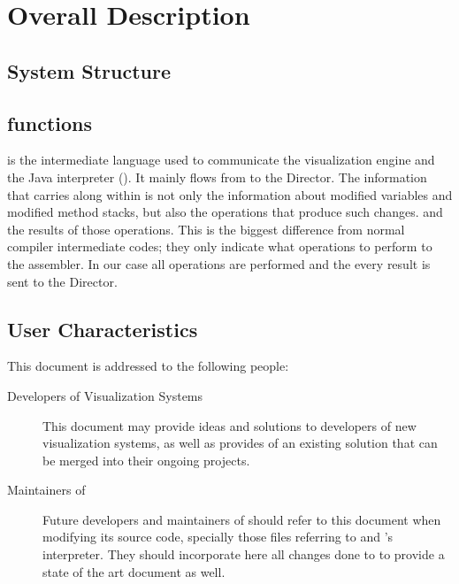 \chapter{Overall Description}
\label{ch:overall}

\section{\jel{} System Structure}
\label{sec:structure}

\section{\mcode{} functions}
\label{sec:functions}
\mcode{} is the intermediate language used to communicate the visualization engine and the Java interpreter (\djava{}). It mainly flows from \djava{}to the Director.  The information that carries along within is not only the information about modified variables and modified method stacks, but also the operations that produce such changes. and the results of those operations. This is the biggest difference from normal compiler intermediate codes; they only indicate what operations to perform to the assembler. In our case all operations are performed and the every result is sent to the Director.

\section{User Characteristics}
\label{sec:users}
This document is addressed to the following people:
\begin{description}
\item[Developers of Visualization Systems] This document may provide ideas and solutions to developers of new visualization systems, as well as provides of an existing solution that can be merged into their ongoing projects.
\item[Maintainers of \jel{}] Future developers and maintainers of \jel{} should refer to this document when modifying its source code, specially those files referring to \djava{} and \jel{}'s interpreter. They should incorporate here all changes done to \mcode{} to provide a state of the art document as well. 
\end{description}

